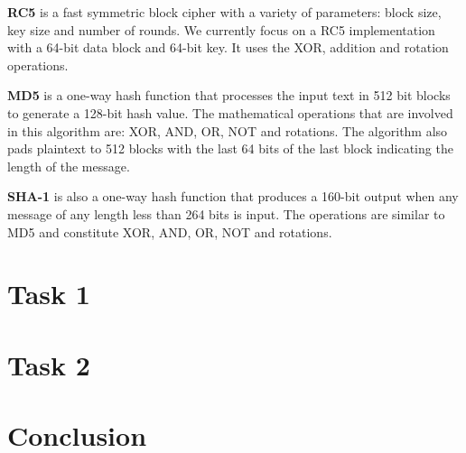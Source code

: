 \documentclass[11pt]{scrartcl} %
\begin{document}
\textbf{RC5} is a fast symmetric block cipher with a variety of parameters: block size, key size and number of rounds. We currently focus on a RC5 implementation with a 64-bit data 
block and 64-bit key. It uses the XOR, addition and rotation operations.

\textbf{MD5} is a one-way hash function that processes the input text in 512 bit blocks to generate a 128-bit hash value. The mathematical operations that are involved in this 
algorithm are: XOR, AND, OR, NOT and rotations. The algorithm also pads plaintext to 512 blocks with the last 64 bits of the last block indicating the length of the
message.

\textbf{SHA-1} is also a one-way hash function that produces a 160-bit output when any message of any length less than 264 bits is input. The operations are similar to MD5 and 
constitute XOR, AND, OR, NOT and rotations. 


\section{Task 1}

\section{Task 2}

\section{Conclusion}


{}
\end{document}
